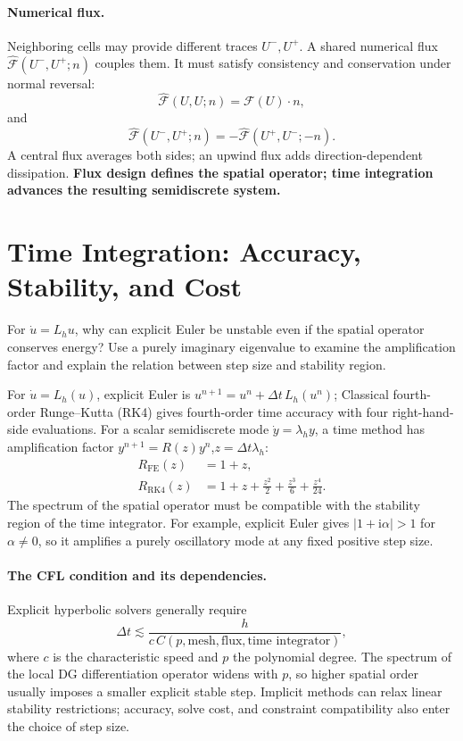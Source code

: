 \documentclass[11pt,openany]{book}
\numberwithin{equation}{chapter}
\theoremstyle{definition}
\theoremstyle{remark}
\begin{document}
\paragraph{Numerical flux.}
Neighboring cells may provide different traces $U^-,U^+$. A shared numerical flux $\widehat{\mathcal F}(U^-,U^+;n)$ couples them. It must satisfy consistency and conservation under normal reversal:
\begin{equation}
\widehat{\mathcal F}(U,U;n)=\mathcal F(U)\cdot n,
\end{equation}
and
\begin{equation}
\widehat{\mathcal F}(U^-,U^+;n)
=-\widehat{\mathcal F}(U^+,U^-;-n).
\end{equation}
A central flux averages both sides; an upwind flux adds direction-dependent dissipation. \textbf{Flux design defines the spatial operator; time integration advances the resulting semidiscrete system.}

\section{Time Integration: Accuracy, Stability, and Cost}
\begin{checkpoint}
For $\dot u=L_hu$, why can explicit Euler be unstable even if the spatial operator conserves energy? Use a purely imaginary eigenvalue to examine the amplification factor and explain the relation between step size and stability region.
\end{checkpoint}
For $\dot u=L_h(u)$, explicit Euler is
$u^{n+1}=u^n+\Delta t\,L_h(u^n)$;
Classical fourth-order Runge--Kutta (RK4) gives fourth-order time accuracy with four right-hand-side evaluations. For a scalar semidiscrete mode $\dot y=\lambda_h y$, a time method has amplification factor
$y^{n+1}=R(z)y^n$,$z=\Delta t\lambda_h$:
\begin{align}
R_{\mathrm{FE}}(z)&=1+z,\\
R_{\mathrm{RK4}}(z)&=1+z+\frac{z^2}{2}+\frac{z^3}{6}+\frac{z^4}{24}.
\end{align}
The spectrum of the spatial operator must be compatible with the stability region of the time integrator.
For example, explicit Euler gives $|1+\mathrm i\alpha|>1$ for $\alpha\ne0$,
so it amplifies a purely oscillatory mode at any fixed positive step size.

\paragraph{The CFL condition and its dependencies.}
Explicit hyperbolic solvers generally require
\begin{equation}\label{eq:cflgeneral}
\Delta t\lesssim \frac{h}{c\,C(p,\text{mesh},\text{flux},\text{time integrator})},
\end{equation}
where $c$ is the characteristic speed and $p$ the polynomial degree. The spectrum of the local DG differentiation operator widens with $p$, so higher spatial order usually imposes a smaller explicit stable step.
Implicit methods can relax linear stability restrictions; accuracy, solve cost, and constraint compatibility also enter the choice of step size.
\end{document}
